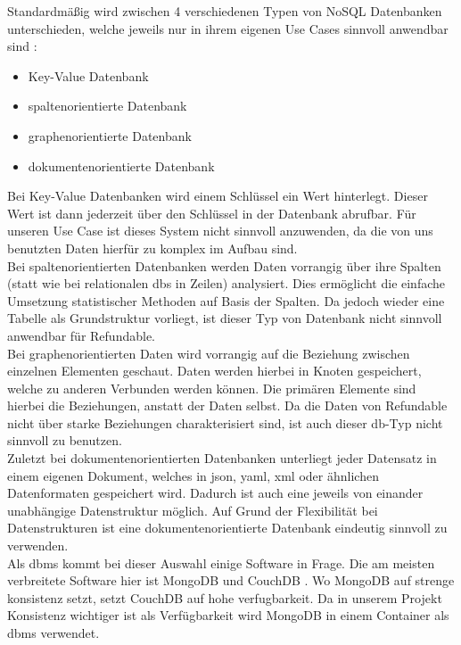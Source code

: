 		Standardmäßig wird zwischen 4 verschiedenen Typen von NoSQL Datenbanken unterschieden, welche jeweils nur in ihrem eigenen Use Cases sinnvoll anwendbar sind \cite{nosqltypes}:
		\begin{itemize}
			
			\item Key-Value Datenbank
			\item spaltenorientierte Datenbank
			\item graphenorientierte Datenbank
			\item dokumentenorientierte Datenbank
		\end{itemize}			
		Bei Key-Value Datenbanken wird einem Schlüssel ein Wert hinterlegt. Dieser Wert ist dann jederzeit über den Schlüssel in der Datenbank abrufbar. Für unseren Use Case ist dieses System nicht sinnvoll anzuwenden, da die von uns benutzten Daten hierfür zu komplex im Aufbau sind.~\\
		Bei spaltenorientierten Datenbanken werden Daten vorrangig über ihre Spalten (statt wie bei relationalen \gls{db}s in Zeilen) analysiert. Dies ermöglicht die einfache Umsetzung statistischer Methoden auf Basis der Spalten. Da jedoch wieder eine Tabelle als Grundstruktur vorliegt, ist dieser Typ von Datenbank nicht sinnvoll anwendbar für Refundable.~\\
		Bei graphenorientierten Daten wird vorrangig auf die Beziehung zwischen einzelnen Elementen geschaut. Daten werden hierbei in Knoten gespeichert, welche zu anderen Verbunden werden können. Die primären Elemente sind hierbei die Beziehungen, anstatt der Daten selbst. Da die Daten von Refundable nicht über starke Beziehungen charakterisiert sind, ist auch dieser \gls{db}-Typ nicht sinnvoll zu benutzen.~\\		
		Zuletzt bei dokumentenorientierten Datenbanken unterliegt jeder Datensatz in einem eigenen Dokument, welches in \Gls{json}, \Gls{yaml}, \Gls{xml} oder ähnlichen Datenformaten gespeichert wird. Dadurch ist auch eine jeweils von einander unabhängige Datenstruktur möglich. Auf Grund der Flexibilität bei Datenstrukturen ist eine dokumentenorientierte Datenbank eindeutig sinnvoll zu verwenden.~\\
		
		Als \gls{dbms} kommt bei dieser Auswahl einige Software in Frage. Die am meisten verbreitete Software hier ist MongoDB und CouchDB \cite{mongo}. Wo MongoDB auf strenge \gls{konsistenz} setzt, setzt CouchDB auf hohe \gls{verfugbarkeit}. Da in unserem Projekt Konsistenz wichtiger ist als Verfügbarkeit wird MongoDB in einem Container als \gls{dbms} verwendet.
		
